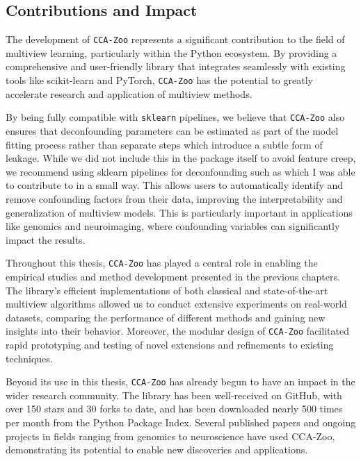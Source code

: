 \subsection{Contributions and Impact}

The development of \texttt{CCA-Zoo} represents a significant contribution to the field of multiview learning, particularly within the Python ecosystem. By providing a comprehensive and user-friendly library that integrates seamlessly with existing tools like scikit-learn and PyTorch, \texttt{CCA-Zoo} has the potential to greatly accelerate research and application of multiview methods.

By being fully compatible with \texttt{sklearn} pipelines, we believe that \texttt{CCA-Zoo} also ensures that deconfounding parameters can be estimated as part of the model fitting process rather than separate steps which introduce a subtle form of leakage. While we did not include this in the package itself to avoid feature creep, we recommend using {sklearn} pipelines for deconfounding such as \citet{pradeep_reddy_raamana} which I was able to contribute to in a small way. This allows users to automatically identify and remove confounding factors from their data, improving the interpretability and generalization of multiview models. This is particularly important in applications like genomics and neuroimaging, where confounding variables can significantly impact the results.

Throughout this thesis, \texttt{CCA-Zoo} has played a central role in enabling the empirical studies and method development presented in the previous chapters. The library's efficient implementations of both classical and state-of-the-art multiview algorithms allowed us to conduct extensive experiments on real-world datasets, comparing the performance of different methods and gaining new insights into their behavior. Moreover, the modular design of \texttt{CCA-Zoo} facilitated rapid prototyping and testing of novel extensions and refinements to existing techniques.

Beyond its use in this thesis, \texttt{CCA-Zoo} has already begun to have an impact in the wider research community. The library has been well-received on GitHub, with over 150 stars and 30 forks to date, and has been downloaded nearly 500 times per month from the Python Package Index. Several published papers and ongoing projects in fields ranging from genomics to neuroscience have used CCA-Zoo, demonstrating its potential to enable new discoveries and applications.

